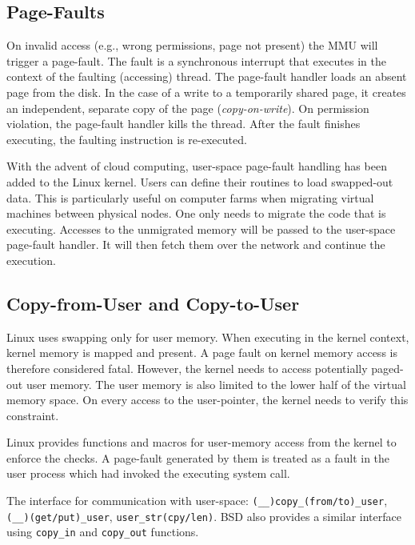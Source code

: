 \subsection{Page-Faults}
\label{subsec:pagefaults}
On invalid access (e.g., wrong permissions, page not present) the MMU will
trigger a page-fault. The fault is a synchronous interrupt that executes in the
context of the faulting (accessing) thread. The page-fault handler loads an
absent page from the disk. In the case of a write to a temporarily shared page,
it creates an independent, separate copy of the page (\emph{copy-on-write}). On
permission violation, the page-fault handler kills the thread. After the fault
finishes executing, the faulting instruction is re-executed. 

With the advent of cloud computing, user-space page-fault handling has been added 
to the Linux kernel. Users can define their routines to load swapped-out data.
This is particularly useful on computer farms when migrating virtual machines
between physical nodes. One only needs to migrate the code that is executing.
Accesses to the unmigrated memory will be passed to the user-space page-fault
handler. It will then fetch them over the network and continue the execution.

\subsection{Copy-from-User and Copy-to-User}
\label{subsec:copy}
Linux uses swapping only for user memory. When executing in the kernel context,
kernel memory is mapped and present. A page fault on kernel memory access is
therefore considered fatal. However, the kernel needs to access potentially
paged-out user memory. The user memory is also limited to the lower half of the
virtual memory space. On every access to the user-pointer, the kernel needs to
verify this constraint.

Linux provides functions and macros for user-memory access from the kernel to 
enforce the checks. A page-fault generated by them is treated as a fault in the
user process which had invoked the executing system call.

The interface for communication with user-space: \texttt{(\_\_)copy\_(from/to)\_user},
\texttt{(\_\_)(get/put)\_user}, \texttt{user\_str(cpy/len)}.
BSD also provides a similar interface using \texttt{copy\_in} and 
\texttt{copy\_out} functions.

